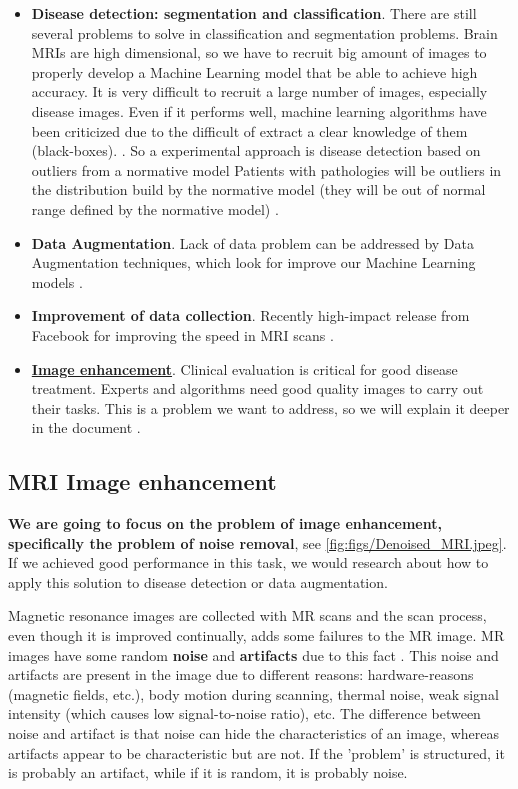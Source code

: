 \begin{itemize}
    \item \textbf{Disease detection: segmentation and classification}. There are still several problems to solve in classification and segmentation problems. Brain MRIs are high dimensional, so we have to recruit big amount of images to properly develop a Machine Learning model that be able to achieve high accuracy. It is very difficult to recruit a large number of images, especially disease images. Even if it performs well, machine learning algorithms have been criticized due to the difficult of extract a clear knowledge of them (black-boxes).  \cite{myronenko20183d}. So a experimental approach is disease detection based on outliers from a normative model Patients with pathologies will be outliers in the distribution build by the normative model (they will be out of normal range defined by the normative model) \cite{marquand2016normative} \cite{mourao2011outlier}.
    \item \textbf{Data Augmentation}. Lack of data problem can be addressed by Data Augmentation techniques, which look for improve our Machine Learning models \cite{GanDataAugment2018}.
    \item \textbf{Improvement of data collection}. Recently high-impact  release from Facebook for improving the speed in MRI scans \cite{fastmri}.
    \item \underline{\textbf{Image enhancement}}. Clinical evaluation is critical for good disease treatment. Experts and algorithms need good quality images to carry out their tasks. This is a problem we want to address, so we will explain it deeper in the document \cite{tamada2020review} \cite{myronenko20183d}. 
\end{itemize}

\subsection{MRI Image enhancement}

\textbf{We are going to focus on the problem of image enhancement, specifically the problem of noise removal}, see \ref{fig:figs/Denoised_MRI.jpeg}. If we achieved good performance in this task, we would research about how to apply this solution to disease detection or data augmentation.


Magnetic resonance images are collected with MR scans and the scan process, even though it is improved continually, adds some failures to the MR image. MR images have some random \textbf{noise} and \textbf{artifacts} due to this fact \cite{artifacts86}. This noise and artifacts are present in the image due to different reasons: hardware-reasons (magnetic fields, etc.), body motion during scanning, thermal noise, weak signal intensity (which causes low signal-to-noise ratio), etc. The difference between noise and artifact is that noise can hide the characteristics of an image, whereas artifacts appear to be characteristic but are not. If the 'problem' is structured, it is probably an artifact, while if it is random, it is probably noise.

